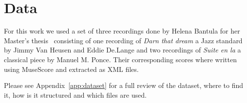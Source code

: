 \section*{Data}
For this work we used a set of three recordings done by Helena Bantula for her Master's thesis~\cite{bantula2016} consisting of one recording of \textit{Darn that dream} a Jazz standard by Jimmy Van Heusen and Eddie De.Lange and two recordings of \textit{Suite en la} a classical piece by Manuel M. Ponce. 
Their corresponding scores where written using MuseScore and extracted as XML files.

Please see Appendix~\ref{app:dataset} for a full review of the dataset, where to find it, how is it structured and which files are used.

\cleardoublepage